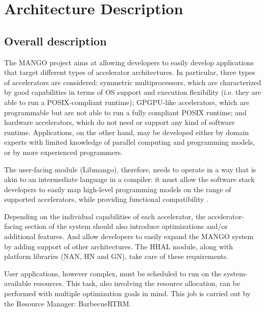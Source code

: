 \chapter{Architecture Description} \label{ch:ArchitectureDescription}

\section{Overall description}

The MANGO project aims at allowing developers to easily develop applications that target different types of accelerator architectures. In particular, three types of accelerators are considered: symmetric multiprocessors, which are characterized by good capabilities in terms of OS support and execution flexibility (i.e. they are able to run a POSIX-compliant runtime); GPGPU-like accelerators, which are programmable but are not able to run a fully compliant POSIX runtime; and hardware accelerators, which do not need or support any kind  of software runtime. Applications, on the other hand, may be developed either by domain experts with limited knowledge of parallel computing and programming models, or by more experienced programmers. 

The user-facing module (Libmango), therefore, needs to operate in a way that is akin to an intermediate language in a compiler: it must allow the software stack developers to easily map high-level programming models on the range of supported accelerators, while providing functional compatibility \cite{mango_exploring_manycore_architectures}. 

Depending on the individual capabilities of each accelerator, the accelerator-facing section of the system should also introduce optimizations and/or additional features. And allow developers to easily expand the MANGO system by adding support of other architectures. The HHAL module, along with platform libraries (NAN, HN and GN), take care of these requirements.

User applications, however complex, must be scheduled to run on the system-available resources. This task, also involving the resource allocation, can be performed with multiple optimization goals in mind. This job is carried out by the Resource Manager: BarbecueRTRM.

